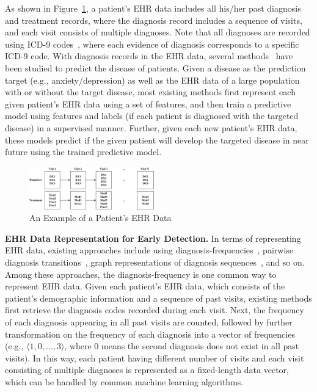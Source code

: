 As shown in Figure~\ref{fig:exp-ehr}, a patient's EHR data includes all his/her past diagnosis and treatment records, where the diagnosis record includes a sequence of visits, and each visit consists of multiple diagnoses.
Note that all diagnoses are recorded using ICD-9 codes~\cite{dubberke2006icd}, where each evidence of diagnosis corresponds to a specific ICD-9 code.
With diagnosis records in the EHR data, several methods~\cite{personalized2015, amarasingham2010automated, pittman2004integrated,jensen2012mining} have been studied to predict the disease of patients.
Given a disease as the prediction target (e.g., anxiety/depression) as well as the EHR data of a large population with or without the target disease, most existing methods first represent each given patient's EHR data using a set of features, and then train a predictive model using features and labels (if each patient is diagnosed with the targeted disease) in a supervised manner.
Further, given each new patient's EHR data, these models predict if the given patient will develop the targeted disease in near future using the trained predictive model.
 

\begin{figure}
\centering
\includegraphics[width=0.48\textwidth]{./img/Patient.png}
\caption{An Example of a Patient's EHR Data}
\label{fig:exp-ehr}
\end{figure}


\textbf{EHR Data Representation for Early Detection.} 
In terms of representing EHR data, existing approaches include using diagnosis-frequencies~\cite{sun2012supervised,7091853,personalized2015}, pairwise diagnosis transitions~\cite{zhang_mseq_2015,jensen2001mining}, graph representations of diagnosis sequences~\cite{liu_temporal_2015}, and so on.
Among these approaches, the diagnosis-frequency is one common way to represent EHR data.
Given each patient's EHR data, which consists of the patient's demographic information and a sequence of past visits, existing methods first retrieve the diagnosis codes recorded during each visit.
Next, the frequency of each diagnosis appearing in all past visits are counted, followed by further transformation on the frequency of each diagnosis into a vector of frequencies (e.g., $\langle 1, 0, \dots, 3\rangle$, where 0 means the second diagnosis does not exist in all past visits).
In this way, each patient having different number of visits and each visit consisting of multiple diagnoses is represented as a fixed-length data vector, which can be handled by common machine learning algorithms.
 

